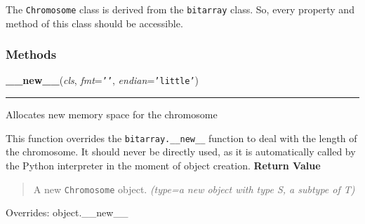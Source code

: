 The \texttt{Chromosome} class is derived from the \texttt{bitarray} class. So, every
property and method of this class should be accessible.


  \subsubsection{Methods}

    \vspace{0.5ex}

\hspace{.8\funcindent}\begin{boxedminipage}{\funcwidth}

    \raggedright \textbf{\_\_new\_\_}(\textit{cls}, \textit{fmt}={\tt \texttt{'}\texttt{}\texttt{'}}, \textit{endian}={\tt \texttt{'}\texttt{little}\texttt{'}})

    \vspace{-1.5ex}

    \rule{\textwidth}{0.5\fboxrule}
\setlength{\parskip}{2ex}

Allocates new memory space for the chromosome

This function overrides the \texttt{bitarray.\_\_new\_\_} function to deal with
the length of the chromosome. It should never be directly used, as it is
automatically called by the Python interpreter in the moment of object
creation.
\setlength{\parskip}{1ex}
      \textbf{Return Value}
    \vspace{-1ex}

      \begin{quote}

A new \texttt{Chromosome} object.
      {\it (type=a new object with type S, a subtype of T)}

      \end{quote}

      Overrides: object.\_\_new\_\_

    \end{boxedminipage}

    \vspace{0.5ex}

